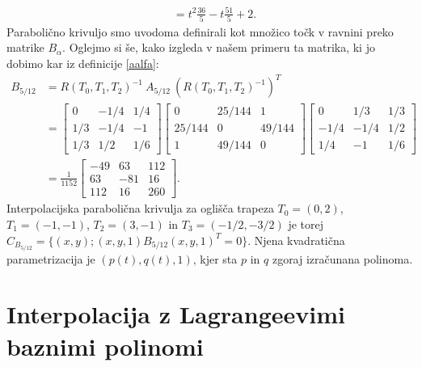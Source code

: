 \documentclass[mat1]{fmfdelo}
\newcommand{\al}{\alpha}
\begin{document}
\begin{primer}
\begin{align*}
       &= t^2 \frac{36}{5} - t \frac{51}{5} + 2.
\end{align*}
Parabolično krivuljo smo uvodoma definirali kot množico točk v ravnini preko matrike $B_\al$. Oglejmo si še, kako izgleda v našem primeru ta matrika, ki jo dobimo kar iz definicije \ref{aalfa}:
%
\begin{align*}
 B_{5/12} &= R(T_0, T_1, T_2)^{-1}\  A_{5/12} \  (R(T_0, T_1, T_2)^{-1})^T \\
 	      &= 
\begin{bmatrix}
0 & -1/4 & 1/4 \\
1/3 & -1/4 & -1 \\
1/3 & 1/2 & 1/6
\end{bmatrix}
\begin{bmatrix}
0 & 25/144 & 1 \\
25/144 & 0 & 49/144 \\
1 & 49/144 & 0
\end{bmatrix}
\begin{bmatrix}
0 & 1/3 & 1/3 \\
-1/4 & -1/4 & 1/2 \\
1/4 & -1 & 1/6
\end{bmatrix}
\\
	& = \frac{1}{1152}
	\begin{bmatrix}
-49 & 63 & 112 \\
63 & -81 & 16 \\
112 & 16 & 260
\end{bmatrix}.
 \end{align*}
 Interpolacijska parabolična krivulja za oglišča trapeza $T_0 = (0, 2)$, $T_1 = (-1,-1)$, $T_2 = (3, -1)$ in $T_3 = (-1/2, -3/2)$ je torej $ C_{B_{5/12}} = \{ (x,y); (x,y,1) B_{5/12} (x, y, 1)^T = 0 \}$. Njena kvadratična parametrizacija je $(p(t), q(t),1)$, kjer sta $p$ in $q$ zgoraj iz\-ra\-ču\-na\-na polinoma.
\end{primer}



\section{Interpolacija z Lagrangeevimi baznimi polinomi}
\end{document}
